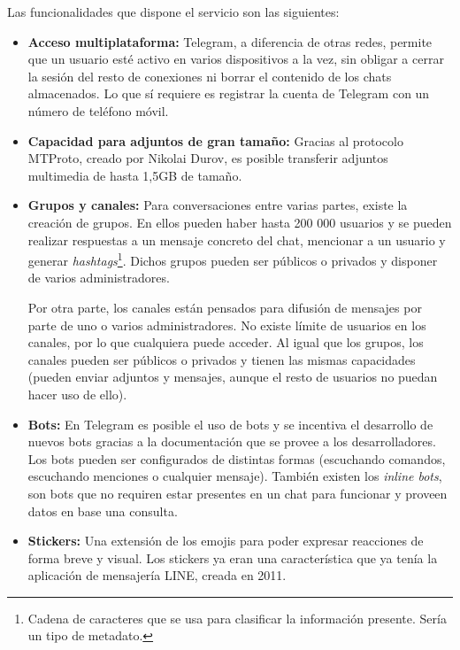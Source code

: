\documentclass[spanish,12pt, a4paper, twoside]{paper}
\begin{document}
Las funcionalidades que dispone el servicio son las siguientes:

\begin{itemize}
\item \textbf{Acceso multiplataforma:} Telegram, a diferencia de otras redes, permite que un usuario esté activo en varios dispositivos a la vez, sin obligar a cerrar la sesión del resto de conexiones ni borrar el contenido de los chats almacenados. Lo que sí requiere es registrar la cuenta de Telegram con un número de teléfono móvil.

\item \textbf{Capacidad para adjuntos de gran tamaño:} Gracias al protocolo MTProto, creado por Nikolai Durov, es posible transferir adjuntos multimedia de hasta 1,5GB de tamaño.

\item \textbf{Grupos y canales:} Para conversaciones entre varias partes, existe la creación de grupos. En ellos pueden haber hasta 200 000 usuarios y se pueden realizar respuestas a un mensaje concreto del chat, mencionar a un usuario y generar \emph{hashtags}\footnote{Cadena de caracteres que se usa para clasificar la información presente. Sería un tipo de metadato.}. Dichos grupos pueden ser públicos o privados y disponer de varios administradores.

Por otra parte, los canales están pensados para difusión de mensajes por parte de uno o varios administradores. No existe límite de usuarios en los canales, por lo que cualquiera puede acceder. Al igual que los grupos, los canales pueden ser públicos o privados y tienen las mismas capacidades (pueden enviar adjuntos y mensajes, aunque el resto de usuarios no puedan hacer uso de ello).

\item \textbf{Bots:} En Telegram es posible el uso de bots y se incentiva el desarrollo de nuevos bots gracias a la documentación que se provee a los desarrolladores. Los bots pueden ser configurados de distintas formas (escuchando comandos, escuchando menciones o cualquier mensaje). También existen los \emph{inline bots}, son bots que no requiren estar presentes en un chat para funcionar y proveen datos en base una consulta.

\item \textbf{Stickers:} Una extensión de los emojis para poder expresar reacciones de forma breve y visual. Los stickers ya eran una característica que ya tenía la aplicación de mensajería LINE, creada en 2011.


\end{itemize}
\end{document}
